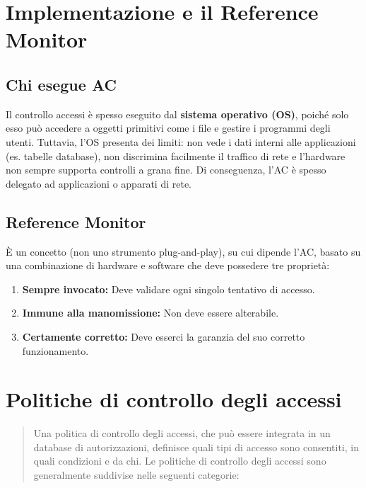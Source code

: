 \documentclass{article}
\begin{document}
\vspace{0.8cm}

\section*{Implementazione e il Reference Monitor}

\subsection*{Chi esegue AC}

Il controllo accessi è spesso eseguito dal \textbf{sistema operativo (OS)}, poiché solo esso può accedere a oggetti primitivi come i file e gestire i programmi degli utenti. Tuttavia, l'OS presenta dei limiti: non vede i dati interni alle applicazioni (es. tabelle database), non discrimina facilmente il traffico di rete e l'hardware non sempre supporta controlli a grana fine. Di conseguenza, l'AC è spesso delegato ad applicazioni o apparati di rete.

\subsection*{Reference Monitor}

È un concetto (non uno strumento plug-and-play), su cui dipende l'AC, basato su una combinazione di hardware e software che deve possedere tre proprietà:

\begin{enumerate}
    \item \textbf{Sempre invocato:} Deve validare ogni singolo tentativo di accesso.
    \item \textbf{Immune alla manomissione:} Non deve essere alterabile.
    \item \textbf{Certamente corretto:} Deve esserci la garanzia del suo corretto funzionamento.
\end{enumerate}

\vspace{0.8cm}

\section*{Politiche di controllo degli accessi}

\begin{quote}
    Una politica di controllo degli accessi, che può essere integrata in un database di autorizzazioni, definisce quali tipi di accesso sono consentiti, in quali condizioni e da chi. Le politiche di controllo degli accessi sono generalmente suddivise nelle seguenti categorie:
\end{quote}
\end{document}
